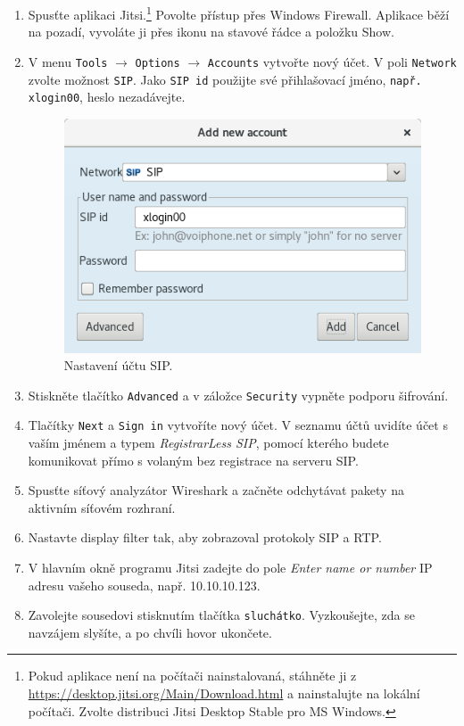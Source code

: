 \documentclass[a4paper,11pt]{article}
\begin{document}
\begin{enumerate}
    \item Spusťte aplikaci Jitsi.\footnote{Pokud aplikace není na počítači nainstalovaná, stáhněte ji z \url{https://desktop.jitsi.org/Main/Download.html} a nainstalujte na lokální počítači. Zvolte distribuci Jitsi Desktop Stable pro MS Windows.} Povolte přístup přes Windows Firewall. Aplikace běží na pozadí, vyvoláte ji přes ikonu na stavové řádce a položku Show. 
    \item V menu {\tt Tools} $\rightarrow$ {\tt Options} $\rightarrow$ {\tt Accounts} vytvořte nový účet. V poli {\tt Network} zvolte možnost {\tt SIP}. Jako {\tt SIP id} použijte své přihlašovací jméno, {\tt např. xlogin00}, heslo nezadávejte.
    \begin{figure}[h]
    	\centering
    	\includegraphics[scale=0.30]{img/account_p2p.png}
    	\caption{Nastavení účtu SIP.}
    	\label{fig:sip_account}
    \end{figure}

    \item Stiskněte tlačítko {\tt Advanced} a v záložce {\tt Security} vypněte podporu šifrování.
    \item Tlačítky {\tt Next} a {\tt Sign in} vytvoříte nový účet. V seznamu účtů  uvidíte účet s vaším jménem a typem {\it RegistrarLess SIP}, pomocí kterého budete komunikovat přímo s volaným bez registrace na serveru SIP.
    \item Spusťte síťový analyzátor Wireshark a začněte odchytávat pakety na aktivním síťovém rozhraní.
    \item Nastavte display filter tak, aby zobrazoval protokoly SIP a RTP.
    \item V hlavním okně programu Jitsi zadejte do pole {\it Enter name or number} IP adresu vašeho souseda, např. 10.10.10.123.
    \item Zavolejte sousedovi stisknutím tlačítka {\tt sluchátko}. Vyzkoušejte, zda se navzájem slyšíte, a po chvíli hovor ukončete.
      

\end{enumerate}
\end{document}

